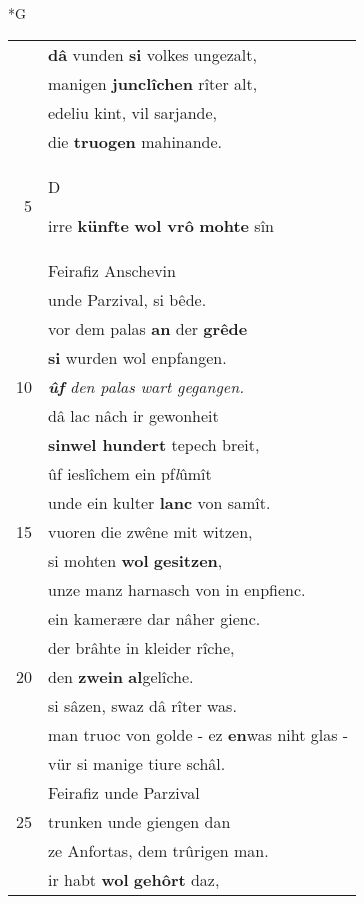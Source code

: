 \documentclass[8pt,a4paper,notitlepage]{article}
\begin{document}
\begin{table}[ht]
\begin{minipage}[t]{0.5\linewidth}
\small
\begin{center}*G
\end{center}
\begin{tabular}{rl}
 & \textbf{dâ} vunden \textbf{si} volkes ungezalt,\\ 
 & manigen \textbf{junclîchen} rîter alt,\\ 
 & edeliu kint, vil sarjande,\\ 
 & die \textbf{truogen} mahinande.\\ 
5 & \begin{large}D\end{large}irre \textbf{künfte} \textbf{wol vrô} \textbf{mohte} sîn\\ 
 & Feirafiz Anschevin\\ 
 & unde Parzival, si bêde.\\ 
 & vor dem palas \textbf{an} der \textbf{grêde}\\ 
 & \textbf{si} wurden wol enpfangen.\\ 
10 & \textit{\textbf{ûf} den palas wart gegangen.}\\ 
 & dâ lac nâch ir gewonheit\\ 
 & \textbf{sinwel hundert} tepech breit,\\ 
 & ûf ieslîchem ein pf\textit{l}ûmît\\ 
 & unde ein kulter \textbf{lanc} von samît.\\ 
15 & vuoren die zwêne mit witzen,\\ 
 & si mohten \textbf{wol} \textbf{gesitzen},\\ 
 & unze manz harnasch von in enpfienc.\\ 
 & ein kamerære dar nâher gienc.\\ 
 & der brâhte in kleider rîche,\\ 
20 & den \textbf{zwein} \textbf{al}gelîche.\\ 
 & si sâzen, swaz dâ rîter was.\\ 
 & man truoc von golde - ez \textbf{en}was niht glas -\\ 
 & vür si manige tiure schâl.\\ 
 & Feirafiz unde Parzival\\ 
25 & trunken unde giengen dan\\ 
 & ze Anfortas, dem trûrigen man.\\ 
 & ir habt \textbf{wol} \textbf{gehôrt} daz,\\ 

\end{tabular}
\end{minipage}
\end{table}
\end{document}

